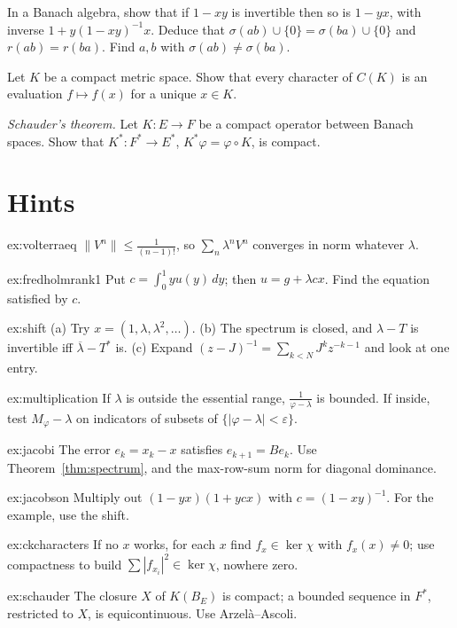 \begin{exercise}[$\star\star$]\label{ex:jacobson}
In a Banach algebra, show that if $1-xy$ is invertible then so is $1-yx$, with inverse $1+y(1-xy)^{-1}x$. Deduce that $\sigma(ab)\cup\{0\}=\sigma(ba)\cup\{0\}$ and $r(ab)=r(ba)$. Find $a,b$ with $\sigma(ab)\ne\sigma(ba)$.
\end{exercise}

\begin{exercise}[$\star$]\label{ex:ckcharacters}
Let $K$ be a compact metric space. Show that every character of $C(K)$ is an evaluation $f\mapsto f(x)$ for a unique $x\in K$.
\end{exercise}

\begin{exercise}[$\star\star\star$]\label{ex:schauder}
\emph{Schauder's theorem.} Let $K:E\to F$ be a compact operator between Banach spaces. Show that $K^*:F^*\to E^*$, $K^*\varphi=\varphi\circ K$, is compact.
\end{exercise}

\section{Hints}

\begin{hint}{ex:volterraeq}
$\|V^n\|\le\frac1{(n-1)!}$, so $\sum_n\lambda^nV^n$ converges in norm whatever $\lambda$.
\end{hint}
\begin{hint}{ex:fredholmrank1}
Put $c=\int_0^1yu(y)\,dy$; then $u=g+\lambda cx$. Find the equation satisfied by $c$.
\end{hint}
\begin{hint}{ex:shift}
(a) Try $x=(1,\lambda,\lambda^2,\dots)$. (b) The spectrum is closed, and $\lambda-T$ is invertible iff $\overline\lambda-T^*$ is. (c) Expand $(z-J)^{-1}=\sum_{k<N}J^kz^{-k-1}$ and look at one entry.
\end{hint}
\begin{hint}{ex:multiplication}
If $\lambda$ is outside the essential range, $\frac1{\varphi-\lambda}$ is bounded. If inside, test $M_\varphi-\lambda$ on indicators of subsets of $\{|\varphi-\lambda|<\varepsilon\}$.
\end{hint}
\begin{hint}{ex:jacobi}
The error $e_k=x_k-x$ satisfies $e_{k+1}=Be_k$. Use Theorem~\ref{thm:spectrum}, and the max-row-sum norm for diagonal dominance.
\end{hint}
\begin{hint}{ex:jacobson}
Multiply out $(1-yx)(1+ycx)$ with $c=(1-xy)^{-1}$. For the example, use the shift.
\end{hint}
\begin{hint}{ex:ckcharacters}
If no $x$ works, for each $x$ find $f_x\in\ker\chi$ with $f_x(x)\ne0$; use compactness to build $\sum|f_{x_i}|^2\in\ker\chi$, nowhere zero.
\end{hint}
\begin{hint}{ex:schauder}
The closure $X$ of $K(B_E)$ is compact; a bounded sequence in $F^*$, restricted to $X$, is equicontinuous. Use Arzel\`a--Ascoli.
\end{hint}

